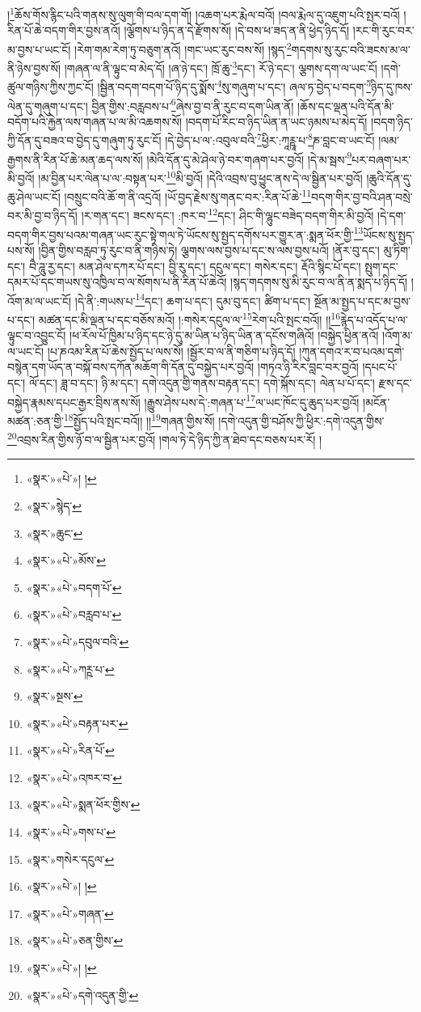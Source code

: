 །\footnote{«སྣར་»«པེ་»། །}ཆོས་གོས་རྙིང་པའི་གནས་སུ་ལུག་གི་བལ་དག་གོ། །འཆག་པར་རྨེལ་བའོ། །བལ་རྨེལ་དུ་འཇུག་པའི་སྤར་བའོ། །རིན་པོ་ཆེ་བདག་གིར་བྱས་ནའོ། །ལྕོགས་པ་ཉིད་ན་དེ་རྫོགས་སོ། །དེ་བས་ཕ་ཟད་ན་ནི་ཕྱེད་ཉིད་དོ། །རང་གི་རུང་བར་མ་བྱས་པ་ཡང་ངོ། །རེག་གམ་རེག་ཏུ་བཅུག་ནའོ། །གང་ཡང་རུང་བས་སོ། །སྙད་\footnote{«སྣར་»སྙེད་}གདགས་སུ་རུང་བའི་ཟངས་མ་ལ་ནི་ཉེས་བྱས་སོ། །གཞན་ལ་ནི་ལྟུང་བ་མེད་དོ། །ཞ་ཉེ་དང་། ཁྲོ་ཆུ་\footnote{«སྣར་»ཆུང་}དང་། རོ་ཉེ་དང་། ལྕགས་དག་ལ་ཡང་ངོ། །དགེ་ཚུལ་གཉིས་ཀྱིས་ཀྱང་ངོ། །སྦྱིན་བདག་བདག་པོ་ཉིད་དུ་སྨོས་\footnote{«སྣར་»«པེ་»མོས་}སུ་གཞུག་པ་དང་། ཞལ་ཏ་བྱེད་པ་བདག་\footnote{«སྣར་»«པེ་»བདག་པོ་}ཉིད་དུ་ཁས་ལེན་དུ་གཞུག་པ་དང་། བྱིན་གྱིས་:བརླབས་པ་\footnote{«སྣར་»«པེ་»བརླབ་པ་}ཞེས་བྱ་བ་ནི་རུང་བ་དག་ཡིན་ནོ། །ཆོས་དང་ལྡན་པའི་དོན་མི་བདོག་པའི་རྐྱེན་ལས་གཞན་པ་ལ་མི་འཆགས་སོ། །བདག་པོ་རིང་བ་ཉིད་ཡིན་ན་ཡང་ཉམས་པ་མེད་དོ། །བདག་ཉིད་ཀྱི་དོན་དུ་བཟའ་བ་བྱེད་དུ་གཞུག་ཏུ་རུང་ངོ། །དེ་བྱེད་པ་ལ་:འབུལ་བའི་\footnote{«སྣར་»«པེ་»དབུལ་བའི་}ཕྱིར་:ཀཱཪྵཱ་པ་\footnote{«སྣར་»«པེ་»ཀཪྵ་པ་}ཎ་བླང་བ་ཡང་ངོ། །ལམ་རྒྱགས་ནི་རིན་པོ་ཆེ་མན་ཆད་ལས་སོ། །མེའི་དོན་དུ་མེ་ཤེལ་ཉེ་བར་གཞག་པར་བྱའོ། །དེ་མ་སྦས་\footnote{«སྣར་»སྔས་}པར་བཞག་པར་མི་བྱའོ། །མ་བྱིན་པར་ལེན་པ་ལ་:བསྟན་པར་\footnote{«སྣར་»«པེ་»བརྟན་པར་}མི་བྱའོ། །དེའི་འབྲས་བུ་ཕྱུང་ནས་དེ་ལ་སྦྱིན་པར་བྱའོ། །ཆུའི་དོན་དུ་ཆུ་ཤེལ་ཡང་ངོ། །བསྲུང་བའི་ཆོ་ག་ནི་འདྲའོ། །ཡོ་བྱད་རྗེས་སུ་གནང་བར་:རིན་པོ་ཆེ་\footnote{«སྣར་»«པེ་»རིན་པོ་}བདག་གིར་བྱ་བའི་ཤན་བསྲེ་བར་མི་བྱ་བ་ཉིད་དོ། །ར་གན་དང་། ཟངས་དང་། :ཁར་བ་\footnote{«སྣར་»«པེ་»འཁར་བ་}དང་། ཤིང་གི་ལྷུང་བཟེད་བདག་གིར་མི་བྱའོ། །དེ་དག་བདག་གིར་བྱས་པའམ་གཞན་ཡང་རུང་སྟེ་གལ་ཏེ་ཡོངས་སུ་སྤྱད་དགོས་པར་གྱུར་ན་:སྨན་ཕོར་གྱི་\footnote{«སྣར་»«པེ་»སྨན་ཕོར་གྱིས་}ཡོངས་སུ་སྤྱད་པས་སོ། །བྱིན་གྱིས་བརླབ་ཏུ་རུང་བ་ནི་གཉིས་ཏེ། ལྕགས་ལས་བྱས་པ་དང་ས་ལས་བྱས་པའོ། །ནོར་བུ་དང་། མུ་ཏིག་དང་། བཻ་ཌཱུ་རྱ་དང་། མན་ཤེལ་དཀར་པོ་དང་། བྱི་རུ་དང་། དངུལ་དང་། གསེར་དང་། རྡོའི་སྙིང་པོ་དང་། སྤུག་དང་དམར་པོ་དང་གཡས་སུ་འཁྱིལ་བ་ལ་སོགས་པ་ནི་རིན་པོ་ཆེའོ། །སྙད་གདགས་སུ་མི་རུང་བ་ལ་ནི་ན་སྨད་པ་ཉིད་དོ། །འོག་མ་ལ་ཡང་ངོ། །དེ་ནི་:གཡས་པ་\footnote{«སྣར་»«པེ་»གས་པ་}དང་། ཆག་པ་དང་། དུམ་བུ་དང་། ཚིག་པ་དང་། སྔོན་མ་སྤྱད་པ་དང་མ་བྱས་པ་དང་། མཚན་དང་མི་ལྡན་པ་དང་བཅོས་མའོ། །:གསེར་དངུལ་ལ་\footnote{«སྣར་»གསེར་དངུལ་}རེག་པའི་སྤང་བའོ།། །།\footnote{«སྣར་»«པེ་»། །}རྙེད་པ་འདོད་པ་ལ་ལྟུང་བ་འབྱུང་ངོ། །ཕ་རོལ་པོ་ཁྱིམ་པ་ཉིད་དང་ཉེ་དུ་མ་ཡིན་པ་ཉིད་ཡིན་ན་དངོས་གཞིའོ། །བསྐྱེད་ཕྱིན་ནའོ། །འོག་མ་ལ་ཡང་ངོ། །པ་ཎའམ་རིན་པོ་ཆེས་སྤྱོད་པ་ལས་སོ། །སྦྱོར་བ་ལ་ནི་གཅིག་པ་ཉིད་དོ། །ཀུན་དགའ་ར་བ་པའམ་དགེ་བསྙེན་དག་ཡོད་ན་བསྐོ་བས་དཀོན་མཆོག་གི་དོན་དུ་བསྐྱེད་པར་བྱའོ། །གཏའ་ཉི་རིར་བླང་བར་བྱའོ། །དཔང་པོ་དང་། ལོ་དང་། ཟླ་བ་དང་། ཉི་མ་དང་། དགེ་འདུན་གྱི་གནས་བརྟན་དང་། དགེ་སྐོས་དང་། ལེན་པ་པོ་དང་། རྫས་དང་བསྐྱེད་རྣམས་དཔང་རྒྱར་བྲིས་ནས་སོ། །རྒྱུས་ཤེས་པས་དེ་:གཞན་པ་\footnote{«སྣར་»«པེ་»གཞན་}ལ་ཡང་ཁོང་དུ་ཆུད་པར་བྱའོ། །མངོན་མཚན་:ཅན་གྱི་\footnote{«སྣར་»«པེ་»ཅན་གྱིས་}སྤྱོད་པའི་སྤང་བའོ།། །།\footnote{«སྣར་»«པེ་»། །}གཞན་གྱིས་སོ། །དགེ་འདུན་གྱི་བཤོས་ཀྱི་ཕྱིར་:དགེ་འདུན་གྱིས་\footnote{«སྣར་»«པེ་»དགེ་འདུན་གྱི་}འབྲས་རིན་གྱིས་ཉོ་བ་ལ་སྦྱིན་པར་བྱའོ། །གལ་ཏེ་དེ་ཉིད་ཀྱི་ན་ཐེབ་དང་བཅས་པར་རོ། །
